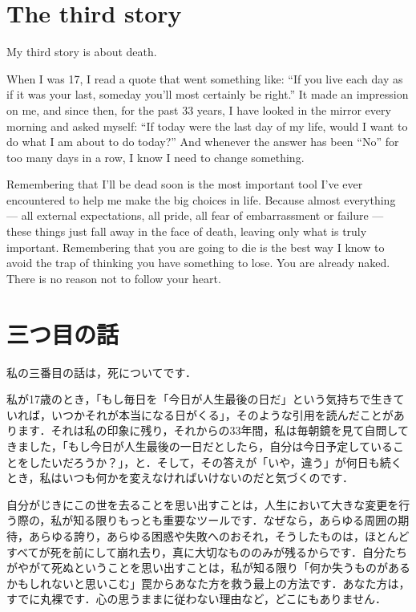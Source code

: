 \documentclass[twocolumn]{jsarticle}
\begin{document}
\newpage

\section*{The third story}

My third story is about death.

When I was 17, I read a quote that went something like: ``If you live each day as if it was your last, someday you'll most certainly be right.'' It made an impression on me, and since then, for the past 33 years, I have looked in the mirror every morning and asked myself: ``If today were the last day of my life, would I want to do what I am about to do today?'' And whenever the answer has been ``No'' for too many days in a row, I know I need to change something.

Remembering that I'll be dead soon is the most important tool I've ever encountered to help me make the big choices in life. Because almost everything — all external expectations, all pride, all fear of embarrassment or failure — these things just fall away in the face of death, leaving only what is truly important. Remembering that you are going to die is the best way I know to avoid the trap of thinking you have something to lose. You are already naked. There is no reason not to follow your heart.



\newpage

\section*{三つ目の話}

私の三番目の話は，死についてです．

私が17歳のとき，「もし毎日を「今日が人生最後の日だ」という気持ちで生きていれば，いつかそれが本当になる日がくる」，そのような引用を読んだことがあります．それは私の印象に残り，それからの33年間，私は毎朝鏡を見て自問してきました，「もし今日が人生最後の一日だとしたら，自分は今日予定していることをしたいだろうか？」，と．そして，その答えが「いや，違う」が何日も続くとき，私はいつも何かを変えなければいけないのだと気づくのです．



自分がじきにこの世を去ることを思い出すことは，人生において大きな変更を行う際の，私が知る限りもっとも重要なツールです．なぜなら，あらゆる周囲の期待，あらゆる誇り，あらゆる困惑や失敗へのおそれ，そうしたものは，ほとんどすべてが死を前にして崩れ去り，真に大切なもののみが残るからです．自分たちがやがて死ぬということを思い出すことは，私が知る限り「何か失うものがあるかもしれないと思いこむ」罠からあなた方を救う最上の方法です．あなた方は，すでに丸裸です．心の思うままに従わない理由など，どこにもありません．
\end{document}
